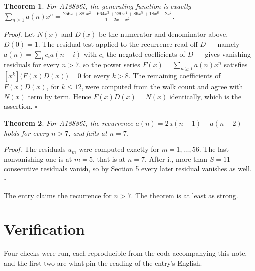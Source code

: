 \documentclass[11pt]{article}
\newtheorem{theorem}{Theorem}
\theoremstyle{definition}
\begin{document}
\begin{theorem} For A188865, the generating function is exactly $\sum_{n\ge 1} a(n)x^n = \frac{256x + 881x^{2} + 664x^{3} + 280x^{4} + 86x^{5} + 18x^{6} + 2x^{7}}{1 - 2x + x^{2}}$.\end{theorem}

{\itshape Proof.} Let $N(x)$ and $D(x)$ be the numerator and denominator above, $D(0)=1$. The residual test applied to the recurrence read off $D$ --- namely $a(n) = \sum_i c_i a(n-i)$ with $c_i$ the negated coefficients of $D$ --- gives vanishing residuals for every $n > 7$, so the power series $F(x)=\sum_{n\ge 1}a(n)x^n$ satisfies $[x^k]\bigl(F(x)D(x)\bigr) = 0$ for every $k > 8$. The remaining coefficients of $F(x)D(x)$, for $k \le 12$, were computed from the walk count and agree with $N(x)$ term by term. Hence $F(x)D(x) = N(x)$ identically, which is the assertion. $\square$

\begin{theorem} For A188865, the recurrence $a(n) = 2\,a(n-1) - a(n-2)$ holds for every $n > 7$, and fails at $n = 7$.\end{theorem}

{\itshape Proof.} The residuals $u_m$ were computed exactly for $m = 1,\dots,56$. The last nonvanishing one is at $m = 5$, that is at $n = 7$. After it, more than $S = 11$ consecutive residuals vanish, so by Section 5 every later residual vanishes as well. $\square$

The entry claims the recurrence for $n > 7$. The theorem is at least as strong.

\section{Verification}

Four checks were run, each reproducible from the code accompanying this note, and the first two are what pin the reading of the entry's English.
\end{document}
